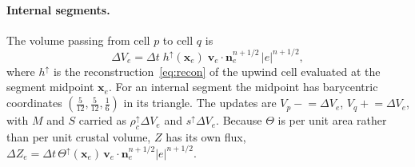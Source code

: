 \documentclass[11pt]{article}
\newcommand{\vect}[1]{\mathbf{#1}}
\begin{document}
\paragraph{Internal segments.} The volume passing from cell $p$ to cell $q$ is
\begin{equation}
  \Delta V_e=\Delta t\;h^\uparrow(\vect{x}_e)\;\vect{v}_e\cdot\vect{n}_e^{n+1/2}\,|e|^{n+1/2},
  \label{eq:flux}
\end{equation}
where $h^\uparrow$ is the reconstruction~\eqref{eq:recon} of the upwind cell evaluated at the segment midpoint $\vect{x}_e$. For an internal segment the midpoint has barycentric coordinates $(\tfrac5{12},\tfrac5{12},\tfrac16)$ in its triangle. The updates are $V_p\mathrel{-}=\Delta V_e$, $V_q\mathrel{+}=\Delta V_e$, with $M$ and $S$ carried as $\rho_c^\uparrow\Delta V_e$ and $s^\uparrow\Delta V_e$. Because $\Theta$ is per unit area rather than per unit crustal volume, $Z$ has its own flux, $\Delta Z_e=\Delta t\,\Theta^\uparrow(\vect{x}_e)\,\vect{v}_e\cdot\vect{n}_e^{n+1/2}|e|^{n+1/2}$.
\end{document}

